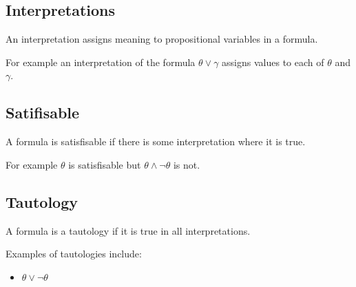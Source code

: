 \subsection{Interpretations}

An interpretation assigns meaning to propositional variables in a formula.

For example an interpretation of the formula \(\theta \lor \gamma \) assigns values to each of \(\theta \) and \(\gamma \).

\subsection{Satifisable}

A formula is satisfisable if there is some interpretation where it is true.

For example \(\theta \) is satisfisable but \(\theta \land \neg \theta \) is not.

\subsection{Tautology}

A formula is a tautology if it is true in all interpretations.

Examples of tautologies include:
\begin{itemize}
\item $\theta \lor \neg \theta $
\end{itemize}

